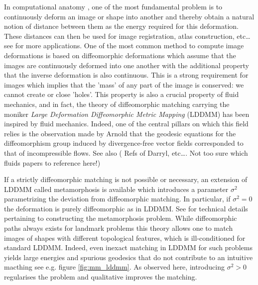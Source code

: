 \documentclass[runningheads]{llncs}
\begin{document}
In computational anatomy
\cite{grenander1994representations,grenander1998computational}, one of the most
fundamental problem is to continuously deform an image or shape into another and
thereby obtain a natural notion of distance between them as the energy required
for this deformation.  These distances can then be used for image registration,
atlas construction, etc\dots see \cite{todo} for more applications. One of the
most common method to compute image deformations is based on diffeomorphic
deformations which assume that the images are continuously deformed into one
another with the additional property that the inverse deformation is also
continuous.  This is a strong requirement for images which implies that the
'mass' of any part of the image is conserved: we cannot create or close 'holes'.
This property is also a crucial property of fluid mechanics, and in fact, the
theory of diffeomorphic matching carrying the moniker \emph{Large Deformation
Diffeomorphic Metric Mapping} \cite{trouve1998diffeomorphisms,beg2005computing}
(LDDMM) has been inspired by fluid mechanics. Indeed, one of the central pillars
on which this field relies is the observation made by Arnold
\cite{arnold1966geometrie} that the geodesic equations for the diffeomorphism
group induced by divergence-free vector fields corresponded to that of
incompressible flows. See also ({\color{red} Refs of Darryl,
etc\dots.}{\color{green} Not too sure which fluids papers to reference here!}) 

If a strictly diffeomorphic matching is not possible or necessary, an extension
of LDDMM called metamorphosis \cite{trouve2005metamorphoses,holm2009euler} is
available which introduces a parameter $\sigma^2$ parametrizing the deviation
from diffeomorphic matching.  In particular, if $\sigma^2=0$ the deformation is
purely diffeomorphic as in LDDMM. See
\cite{trouve1995infinite,trouve2005local,miller2001group} for technical details
pertaining to constructing the metamorphosis problem.  While diffeomorphic paths
always exists for landmark problems \cite{guo2006diffeomorphic} this theory
allows one to match images of shapes with different topological features, which
is ill-conditioned for standard LDDMM. Indeed, even inexact matching in LDDMM
for such problems yields large energies and spurious geodesics that do not
contribute to an intuitive macthing see e.g. figure \ref{fig:mm_lddmm}. As
observed here, introducing $\sigma^2>0$ regularises the problem and qualitative
improves the matching.\\
\end{document}
